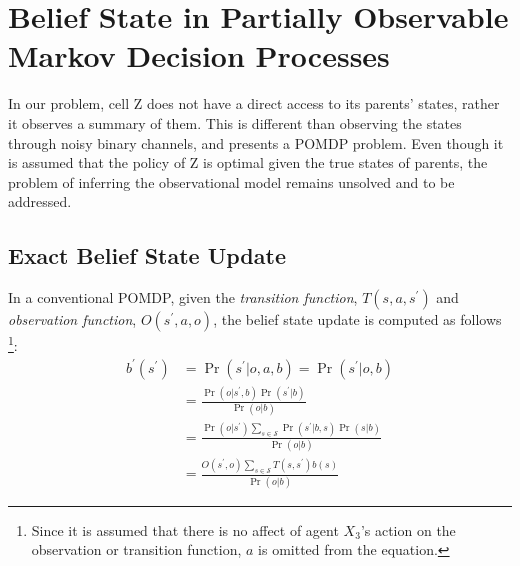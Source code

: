
\section{Belief State in Partially Observable Markov Decision Processes}
In our problem, cell Z does not have a direct access to its parents' states, rather it observes a summary of them. This is different than observing the states through noisy binary channels, and presents a POMDP problem. Even though it is assumed that the policy of Z is optimal given the true states of parents, the problem of inferring the observational model remains unsolved and to be addressed.

\subsection{Exact Belief State Update}

In a conventional POMDP, given the \textit{transition function}, $ T(s, a, s^{\prime})$  and \textit{observation function}, $ O(s^{\prime}, a, o) $, the belief state update is computed as follows \cite{Kaelbling2011} \footnote{Since it is assumed that there is no affect of agent $ X_{3} $'s action on the observation or transition function, $ a $ is omitted from the equation.}:
\begin{equation}
\begin{aligned}
b^{\prime}\left(s^{\prime}\right) &=\operatorname{Pr}\left(s^{\prime} | o, a, b\right) =\operatorname{Pr}\left(s^{\prime} | o, b\right) \\
&=\frac{\operatorname{Pr}\left(o | s^{\prime}, b\right) \operatorname{Pr}\left(s^{\prime} | b\right)}{\operatorname{Pr}(o | b)} \\
&=\frac{\operatorname{Pr}\left(o | s^{\prime}\right) \sum_{s \in \mathcal{S}} \operatorname{Pr}\left(s^{\prime} | b, s\right) \operatorname{Pr}(s | b)}{\operatorname{Pr}(o | b)} \\
&=\frac{O\left(s^{\prime}, o\right) \sum_{s \in \mathcal{S}} T\left(s, s^{\prime}\right) b(s)}{\operatorname{Pr}(o | b)}
\end{aligned}
\label{eq:b}
\end{equation}


